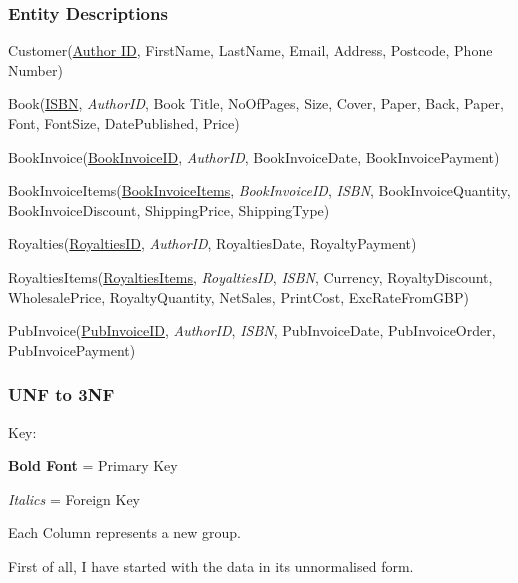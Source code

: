 \subsubsection{Entity Descriptions}

Customer(\underline{Author ID}, FirstName, LastName, Email, Address, Postcode, Phone Number)

Book(\underline{ISBN}, \emph{AuthorID}, Book Title, NoOfPages, Size, Cover, Paper, Back, Paper, Font, FontSize, DatePublished, Price)

BookInvoice(\underline{BookInvoiceID}, \emph{AuthorID}, BookInvoiceDate, BookInvoicePayment)

BookInvoiceItems(\underline{BookInvoiceItems}, \emph{BookInvoiceID}, \emph{ISBN}, BookInvoiceQuantity, BookInvoiceDiscount, ShippingPrice, ShippingType) 

Royalties(\underline{RoyaltiesID}, \emph{AuthorID}, RoyaltiesDate, RoyaltyPayment)

RoyaltiesItems(\underline{RoyaltiesItems}, \emph{RoyaltiesID}, \emph{ISBN}, Currency, RoyaltyDiscount, WholesalePrice, RoyaltyQuantity, NetSales, PrintCost, ExcRateFromGBP)

PubInvoice(\underline{PubInvoiceID}, \emph{AuthorID}, \emph{ISBN}, PubInvoiceDate, PubInvoiceOrder, PubInvoicePayment)




\subsubsection{UNF to 3NF}

Key:

\textbf{Bold Font} = Primary Key

\emph{Italics} = Foreign Key

Each Column represents a new group.

\newpage
First of all, I have started with the data in its unnormalised form.

